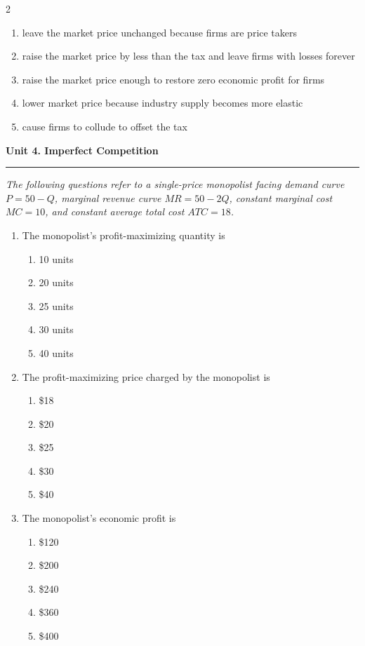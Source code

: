 \documentclass[10pt]{article}
\newenvironment{choiceslist}
  {\begin{enumerate}[label=(\Alph*), leftmargin=1.6em, itemsep=0.12em, topsep=0.18em, parsep=0pt]}
  {\end{enumerate}}
\newenvironment{stimulus}
  {\begin{center}\begin{minipage}{0.96\columnwidth}\footnotesize\itshape\setlength{\tabcolsep}{3pt}\renewcommand{\arraystretch}{0.96}}
  {\end{minipage}\end{center}}
\newcommand{\unitheader}[2]{%
  \vspace{0.35em}
  {\large\bfseries Unit #1. #2\par}
  \vspace{0.2em}
  \hrule
  \vspace{0.45em}
}
\begin{document}
\begin{multicols*}{2}
\begin{enumerate}[resume*=apq, leftmargin=*, itemsep=0.85em, topsep=0.2em, parsep=0pt]
\begin{choiceslist}
\item leave the market price unchanged because firms are price takers
\item raise the market price by less than the tax and leave firms with losses forever
\item raise the market price enough to restore zero economic profit for firms
\item lower market price because industry supply becomes more elastic
\item cause firms to collude to offset the tax
\end{choiceslist}
\end{enumerate}
\unitheader{4}{Imperfect Competition}
\begin{stimulus}
The following questions refer to a single-price monopolist facing demand curve $P = 50 - Q$, marginal revenue curve $MR = 50 - 2Q$, constant marginal cost $MC = 10$, and constant average total cost $ATC = 18$.
\end{stimulus}
\begin{enumerate}[resume*=apq, leftmargin=*, itemsep=0.85em, topsep=0.2em, parsep=0pt]
\item The monopolist's profit-maximizing quantity is
\begin{choiceslist}
\item 10 units
\item 20 units
\item 25 units
\item 30 units
\item 40 units
\end{choiceslist}
\item The profit-maximizing price charged by the monopolist is
\begin{choiceslist}
\item \$18
\item \$20
\item \$25
\item \$30
\item \$40
\end{choiceslist}
\item The monopolist's economic profit is
\begin{choiceslist}
\item \$120
\item \$200
\item \$240
\item \$360
\item \$400
\end{choiceslist}

\end{enumerate}
\end{multicols*}
\end{document}
